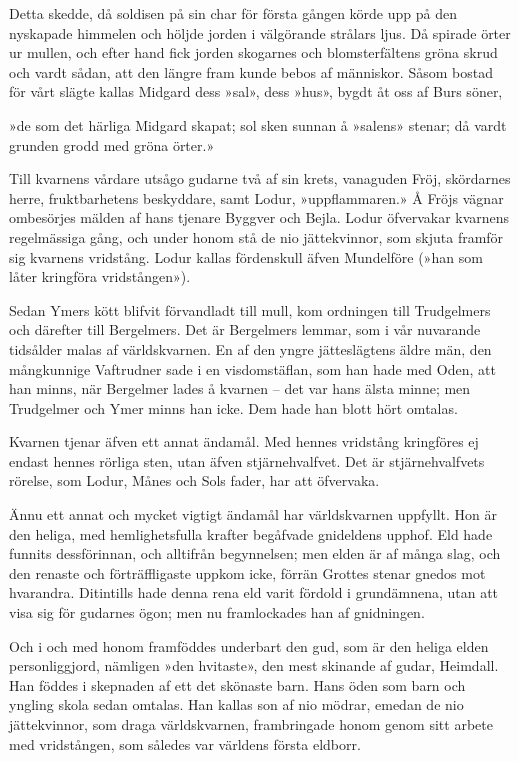 Detta skedde, då soldisen på sin char för första gången körde upp på den
nyskapade himmelen och höljde jorden i välgörande strålars ljus. Då
spirade örter ur mullen, och efter hand fick jorden skogarnes och
blomsterfältens gröna skrud och vardt sådan, att den längre fram kunde
bebos af människor. Såsom bostad för vårt slägte kallas Midgard dess
»sal», dess »hus», bygdt åt oss af Burs söner,

{»de som det härliga}
{Midgard skapat;}
{sol sken sunnan}
{å »salens» stenar;}
{då vardt grunden grodd}
{med gröna örter.»}

Till kvarnens vårdare utsågo gudarne två af sin krets, vanaguden Fröj,
skördarnes herre, fruktbarhetens beskyddare, samt Lodur, »uppflammaren.»
Å Fröjs vägnar ombesörjes mälden af hans tjenare Byggver och Bejla.
Lodur öfvervakar kvarnens regelmässiga gång, och under honom stå de
nio jättekvinnor, som skjuta framför sig kvarnens vridstång. Lodur
kallas fördenskull äfven Mundelföre (»han som låter kringföra
vridstången»).

Sedan Ymers kött blifvit förvandladt till mull, kom ordningen till
Trudgelmers och därefter till Bergelmers. Det är Bergelmers lemmar, som
i vår nuvarande tidsålder malas af världskvarnen. En af den yngre
jätteslägtens äldre män, den mångkunnige Vaftrudner sade i en
visdomstäflan, som han hade med Oden, att han minns, när Bergelmer lades
å kvarnen -- det var hans älsta minne; men Trudgelmer och Ymer minns han
icke. Dem hade han blott hört omtalas.

Kvarnen tjenar äfven ett annat ändamål. Med hennes vridstång kringföres
ej endast hennes rörliga sten, utan äfven stjärnehvalfvet. Det är
stjärnehvalfvets rörelse, som Lodur, Månes och Sols fader, har att
öfvervaka.

Ännu ett annat och mycket vigtigt ändamål har världskvarnen uppfyllt.
Hon är den heliga, med hemlighetsfulla krafter begåfvade gnideldens
upphof. Eld hade funnits dessförinnan, och alltifrån begynnelsen; men
elden är af många slag, och den renaste och förträffligaste uppkom icke,
förrän Grottes stenar gnedos mot hvarandra. Ditintills hade denna rena
eld varit fördold i grundämnena, utan att visa sig för gudarnes ögon;
men nu framlockades han af gnidningen.

Och i och med honom framföddes underbart den gud, som är den heliga
elden personliggjord, nämligen »den hvitaste», den mest skinande af
gudar, Heimdall. Han föddes i skepnaden af ett det skönaste barn. Hans
öden som barn och yngling skola sedan omtalas. Han kallas son af nio
mödrar, emedan de nio jättekvinnor, som draga världskvarnen,
frambringade honom genom sitt arbete med vridstången, som således var
världens första eldborr.


